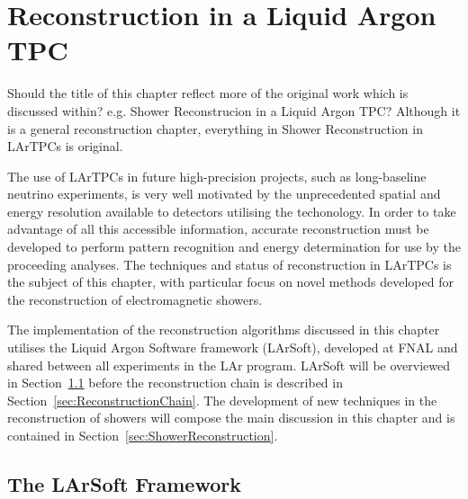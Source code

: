 
\graphicspath{{LArTPCReconstruction/Figs/}}

\chapter{Reconstruction in a Liquid Argon TPC}\label{chap:LArTPCReconstruction}

{\color{red} Should the title of this chapter reflect more of the original work which is discussed within?  e.g. Shower Reconstrucion in a Liquid Argon TPC?  Although  it is a general reconstruction chapter, everything in Shower Reconstruction in LArTPCs is original.}

The use of LArTPCs in future high-precision projects, such as long-baseline neutrino experiments, is very well motivated by the unprecedented spatial and energy resolution available to detectors utilising the techonology.  In order to take advantage of all this accessible information, accurate reconstruction must be developed to perform pattern recognition and energy determination for use by the proceeding analyses.  The techniques and status of reconstruction in LArTPCs is the subject of this chapter, with particular focus on novel methods developed for the reconstruction of electromagnetic showers.

The implementation of the reconstruction algorithms discussed in this chapter utilises the Liquid Argon Software framework (LArSoft), developed at FNAL and shared between all experiments in the LAr program.  LArSoft will be overviewed in Section~\ref{sec:LArSoft} before the reconstruction chain is described in Section~\ref{sec:ReconstructionChain}.  The development of new techniques in the reconstruction of showers will compose the main discussion in this chapter and is contained in Section~\ref{sec:ShowerReconstruction}.

\section{The LArSoft Framework}\label{sec:LArSoft}

